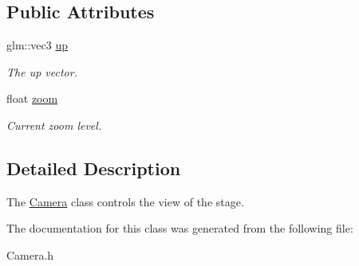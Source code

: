 \subsection*{Public Attributes}
\begin{DoxyCompactItemize}
\item 
glm\+::vec3 \hyperlink{class_camera_a3fe5f351380fb118ffc600591769f049}{up}\hypertarget{class_camera_a3fe5f351380fb118ffc600591769f049}{}\label{class_camera_a3fe5f351380fb118ffc600591769f049}

\begin{DoxyCompactList}\small\item\em The up vector. \end{DoxyCompactList}\item 
float \hyperlink{class_camera_a21fc9e142b104d8e94126657abaa075f}{zoom}\hypertarget{class_camera_a21fc9e142b104d8e94126657abaa075f}{}\label{class_camera_a21fc9e142b104d8e94126657abaa075f}

\begin{DoxyCompactList}\small\item\em Current zoom level. \end{DoxyCompactList}\end{DoxyCompactItemize}


\subsection{Detailed Description}
The \hyperlink{class_camera}{Camera} class controls the view of the stage. 

The documentation for this class was generated from the following file\+:\begin{DoxyCompactItemize}
\item 
Camera.\+h\end{DoxyCompactItemize}
